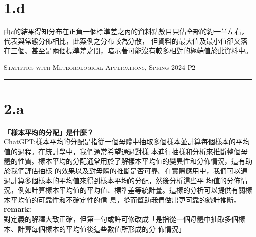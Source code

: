 \documentclass{article}
\begin{document}
\begin{CJK*}{UTF8}{bsmi}
\section*{1.d}
\begin{spacing}{2}
    \begin{large}
        由c的結果得知分布在正負一個標準差之內的資料點數目只佔全部的約一半左右，代表與常態分佈相比，此案例之分布較為分散，
        但資料的最大值及最小值卻又落在三個、甚至是兩個標準差之間，暗示著可能沒有較多相對的極端值於此資料中。
    \end{large}
\end{spacing}

\newpage

\thispagestyle{empty}
\hfill {\scshape \large Statistics with Meteorological Applications, Spring 2024} \hfill {\scshape P2}
\smallskip
\hrule
\bigskip
\bigskip
\bigskip

\section*{2.a}
\begin{spacing}{2}
    \begin{large}
        \textbf{「樣本平均的分配」是什麼？}\\
        ChatGPT:樣本平均的分配是指從一個母體中抽取多個樣本並計算每個樣本的平均值的過程。在統計學中，我們通常希望通過對樣
        本進行抽樣和分析來推斷整個母體的性質。樣本平均的分配通常用於了解樣本平均值的變異性和分佈情況，這有助於我們評估抽樣
        的效果以及對母體的推斷是否可靠。在實際應用中，我們可以通過計算多個樣本的平均值來得到樣本平均的分配，然後分析這些平
        均值的分佈情況，例如計算樣本平均值的平均值、標準差等統計量。這樣的分析可以提供有關樣本平均值的可靠性和不確定性的信
        息，從而幫助我們做出更可靠的統計推斷。\\
        \textbf{remark:}\\
        對定義的解釋大致正確，但第一句或許可修改成「是指從一個母體中抽取多個樣本、計算每個樣本的平均值後這些數值所形成的分
        佈情況」
    \end{large}
\end{spacing}


\end{CJK*}
\end{document}
